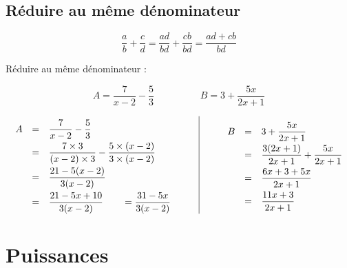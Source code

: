 \subsection{Réduire au même dénominateur}

\begin{prop}

	\[
		\frac{a}{b} + \frac{c}{d} = \frac{ad}{bd} + \frac{cb}{bd} = \frac{ad + cb}{bd}
	\]

\end{prop}

\begin{exo}
	Réduire au même dénominateur :

	\[
		A = \frac{7}{x - 2} - \frac{5}{3} \hspace{2cm} B = 3 + \frac{5x}{2x + 1}
	\]

	\begin{correction}

		\[
			\begin{array}{c|c}
				\def\arraystretch{2}%
				\begin{array}{rcl}
					A & = & \dfrac{7}{x-2} - \dfrac{5}{3}                                            \\
					  & = & \dfrac{7 \times 3}{(x-2)\times 3} - \dfrac{5\times (x-2)}{3\times (x-2)} \\
					  & = & \dfrac{21 - 5(x-2)}{3(x-2)}                                              \\
					  & = & \dfrac{21 - 5x + 10}{3(x-2)} \qquad = \dfrac{31 - 5x}{3(x-2)}            \\
				\end{array}%
				\qquad & \qquad %
				\def\arraystretch{2}%
				\begin{array}{rcl}
					B & = & 3 + \dfrac{5x}{2x+1}                     \\
					  & = & \dfrac{3(2x+1)}{2x+1} + \dfrac{5x}{2x+1} \\
					  & = & \dfrac{6x + 3 + 5x}{2x+1}                \\
					  & = & \dfrac{11x + 3}{2x+1}                    \\
				\end{array}
			\end{array}
		\]

	\end{correction}
\end{exo}

\section{Puissances}

